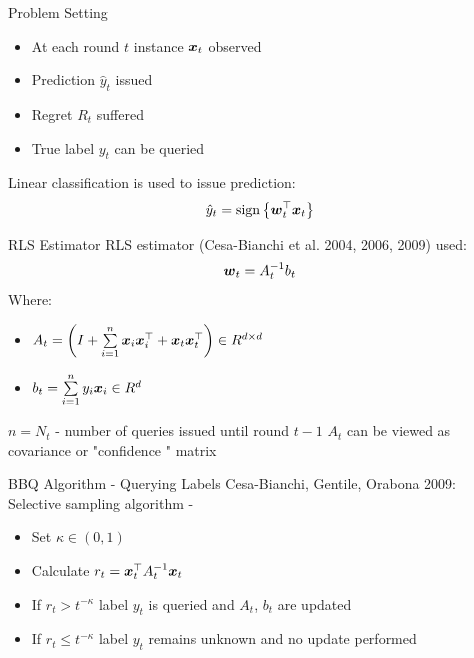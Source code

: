 \documentclass{beamer}
\begin{document}
\begin{frame}{Problem Setting}
\begin{itemize}
\item At each round $t$ instance ${\boldsymbol{x}}_{t}$ observed\newline
\item Prediction $\hat{y}_t$ issued\newline
\item Regret $R_t$ suffered\newline
\item True label $y_t$ can be queried \newline
\end{itemize}
Linear classification is used to issue prediction:
\begin{equation*}
\hat{y}_t={\rm sign}\left\{{{\boldsymbol{w}}}^{\top}_{t}{\boldsymbol{x}}_{t}\right\}
\end{equation*}
\end{frame}


\begin{frame}{RLS Estimator}
RLS estimator (Cesa-Bianchi et al. 2004, 2006, 2009) used:
\begin{equation*}
{\boldsymbol{w}}_{t}=A_{t}^{-1}b_t
\label{RLS2}
\end{equation*}
Where:\newline
\begin{itemize} 
\item $A_t=\left(I+\sum\limits_{i=1}^{n}{\boldsymbol{x}}_{i} {{\boldsymbol{x}}}^{\top}_{i}+ {\boldsymbol{x}}_{t} {{\boldsymbol{x}}}^{\top}_{t}\right)\in R^{d\times d}$\newline
\item $b_t=\sum\limits_{i=1}^{n}y_i{\boldsymbol{x}}_{i}\in R^d$ \newline
\end{itemize}
 $n=N_t$ - number of queries issued until round $t-1$\newline\newline
$A_t$ can be viewed as covariance or "confidence " matrix
\end{frame}

\begin{frame}{BBQ Algorithm - Querying Labels}
Cesa-Bianchi, Gentile, Orabona 2009:
\newline\newline
Selective sampling algorithm -\newline
\begin{itemize}
\item Set $\kappa\in\left(0,1\right)$\newline
\item Calculate $r_t={{\boldsymbol{x}}}^{\top}_{t}A_{t}^{-1}{\boldsymbol{x}}_{t}$\newline
\item  If $r_t> t^{-\kappa}$ label $y_t$ is queried and $A_t$, $b_t$ are updated\newline
\item If $r_t\leq t^{-\kappa}$  label $y_t$ remains unknown and no update performed
\end{itemize}
\end{frame}
\end{document}
